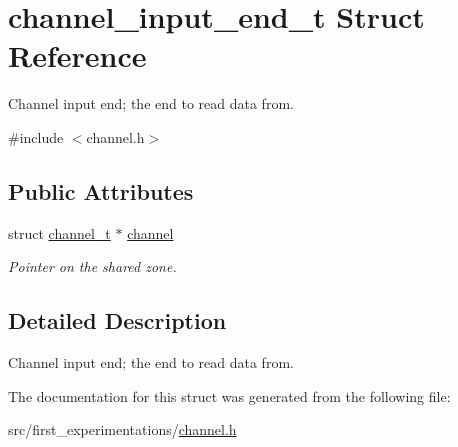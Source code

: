 \hypertarget{structchannel__input__end__t}{\section{channel\-\_\-input\-\_\-end\-\_\-t Struct Reference}
\label{structchannel__input__end__t}
}


Channel input end; the end to read data from.  




{\ttfamily \#include $<$channel.\-h$>$}

\subsection*{Public Attributes}
\begin{DoxyCompactItemize}
\item 
\hypertarget{structchannel__input__end__t_aa63c7db8c6475654ea086c7ff8065107}{struct \hyperlink{structchannel__t}{channel\-\_\-t} $\ast$ \hyperlink{structchannel__input__end__t_aa63c7db8c6475654ea086c7ff8065107}{channel}}\label{structchannel__input__end__t_aa63c7db8c6475654ea086c7ff8065107}

\begin{DoxyCompactList}\small\item\em Pointer on the shared zone. \end{DoxyCompactList}\end{DoxyCompactItemize}


\subsection{Detailed Description}
Channel input end; the end to read data from. 

The documentation for this struct was generated from the following file\-:\begin{DoxyCompactItemize}
\item 
src/first\-\_\-experimentations/\hyperlink{channel_8h}{channel.\-h}\end{DoxyCompactItemize}
